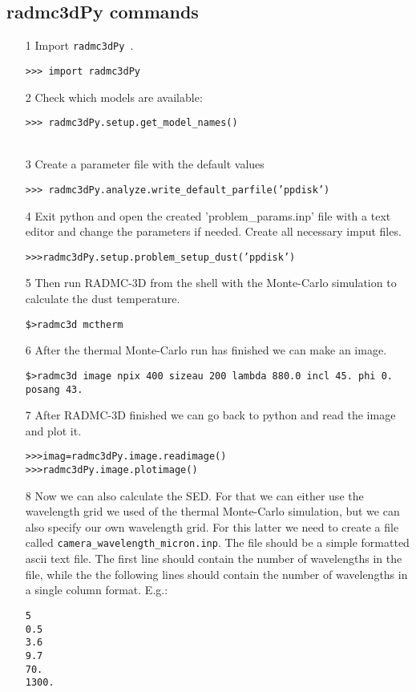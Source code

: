 \documentclass[12pt]{article}
\newcommand{\pymod}{{\tt  radmc3dPy }}
\begin{document}
\subsection*{radmc3dPy commands}
\begin{itemize}

\item[1] Import \pymod.

{\tt >>> import radmc3dPy}\\
\item[2] Check which models are available:

{\tt >>> radmc3dPy.setup.get\_model\_names()}\\
\indent {\tt ['ppdisk']}\\
\item[3] Create a parameter file with the default values

{\tt >>> radmc3dPy.analyze.write\_default\_parfile('ppdisk')}\\
\item[4] Exit python and open the created 'problem\_params.inp' file with a text editor and change the parameters if needed. 
Create all necessary imput files.

{\tt>>>radmc3dPy.setup.problem\_setup\_dust('ppdisk')}\\
\item[5] Then run RADMC-3D from the shell with the Monte-Carlo simulation to calculate the dust temperature.

{\tt \$>radmc3d mctherm}\\
\item[6] After the thermal Monte-Carlo run has finished we can make an image. 

{\tt \$>radmc3d image npix 400 sizeau 200 lambda 880.0 incl 45. phi 0. posang 43.}\\
\item[7] After RADMC-3D finished we can go back to python and read the image and plot it. 

{\tt>>>imag=radmc3dPy.image.readimage()}\\
{\tt>>>radmc3dPy.image.plotimage()}
\item[8] Now we can also calculate the SED. For that we can  either use the wavelength grid we used of the thermal
Monte-Carlo simulation, but we can also specify our own wavelength grid. For this latter we need to create a file
called {\tt camera\_wavelength\_micron.inp}. The file should be a simple formatted ascii text file. The first line should
contain the number of wavelengths in the file, while the the following lines should contain the number of wavelengths
in a single column format. E.g.:
\begin{verbatim}
5
0.5
3.6
9.7
70.
1300.
\end{verbatim} 


\end{itemize}
\end{document}
